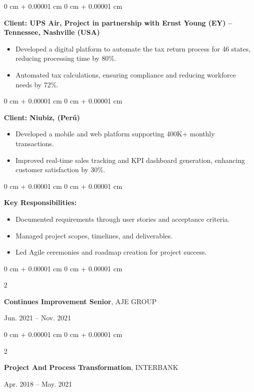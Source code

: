 \documentclass[10pt, letterpaper]{article}
\newenvironment{highlights}{
    \begin{itemize}[
        topsep=0.10 cm,
        parsep=0.10 cm,
        partopsep=0pt,
        itemsep=0pt,
        leftmargin=0 cm + 10pt
    ]
}{
    \end{itemize}
} %
\newenvironment{onecolentry}{
    \begin{adjustwidth}{
        0 cm + 0.00001 cm
    }{
        0 cm + 0.00001 cm
    }
}{
    \end{adjustwidth}
} %
\newenvironment{twocolentry}[2][]{
    \onecolentry
    \def\secondColumn{#2}
    \setcolumnwidth{\fill, 4.5 cm}
    \begin{paracol}{2}
}{
    \switchcolumn \raggedleft \secondColumn
    \end{paracol}
    \endonecolentry
} %
\begin{document}
        \begin{onecolentry}
            \textbf{Client: UPS Air, Project in partnership with Ernst Young (EY) -- Tennessee, Nashville (USA)}
            \begin{highlights}
                \item Developed a digital platform to automate the tax return process for 46 states, reducing processing time by 80\%.
                \item Automated tax calculations, ensuring compliance and reducing workforce needs by 72\%.
            \end{highlights}
        \end{onecolentry}
        \begin{onecolentry}
            \textbf{Client: Niubiz, (Per\'u)}
            \begin{highlights}
                \item Developed a mobile and web platform supporting 400K+ monthly transactions.
                \item Improved real-time sales tracking and KPI dashboard generation, enhancing customer satisfaction by 30\%.
            \end{highlights}
        \end{onecolentry}
        
        \begin{onecolentry}
            \textbf{Key Responsibilities:}
            \begin{highlights}
                \item Documented requirements through user stories and acceptance criteria.
                \item Managed project scopes, timelines, and deliverables.
                \item Led Agile ceremonies and roadmap creation for project success.
            \end{highlights}
        \end{onecolentry}
        \vspace{0.4 cm}
        \begin{twocolentry}{
        Jun. 2021 -- Nov. 2021
    }
        \textbf{Continues Improvement Senior}, AJE GROUP
    \end{twocolentry}
    \vspace{0.2 cm}

        \begin{twocolentry}{
            Apr. 2018 -- May. 2021
        }
            \textbf{Project And Process Transformation}, INTERBANK
        \end{twocolentry}
        \vspace{0.2 cm}
        
\end{document}
